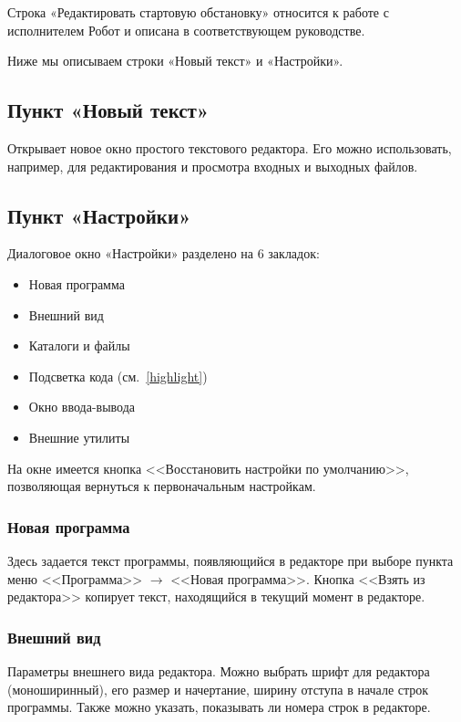 \documentclass[12pt,a4paper]{article}
\begin{document}
Строка «Редактировать стартовую обстановку» относится к работе с исполнителем Робот и описана в соответствующем руководстве.

Ниже мы описываем строки «Новый текст» и «Настройки».

\subsection{Пункт «Новый текст»}

Открывает новое окно простого текстового редактора. Его можно использовать, например, для редактирования и просмотра входных и выходных файлов.

\subsection{Пункт «Настройки»}

Диалоговое окно «Настройки» разделено на 6 закладок:
\begin{itemize}
\item Новая программа
\item Внешний вид
\item Каталоги и файлы
\item Подсветка кода (см.~\ref{highlight})
\item Окно ввода-вывода
\item Внешние утилиты
\end{itemize}

На окне имеется кнопка <<Восстановить настройки по умолчанию>>, позволяющая вернуться к первоначальным настройкам.

\subsubsection{Новая программа}

Здесь задается текст программы, появляющийся в редакторе при выборе пункта меню <<Программа>> $\to$ <<Новая программа>>. Кнопка <<Взять из редактора>> копирует текст, находящийся в текущий момент в редакторе.

\subsubsection{Внешний вид}
\label{settings-view}

Параметры внешнего вида редактора. Можно выбрать шрифт для редактора (моноширинный), его размер и начертание, ширину отступа в начале строк программы. Также можно указать, показывать ли номера строк в редакторе.
\end{document}
